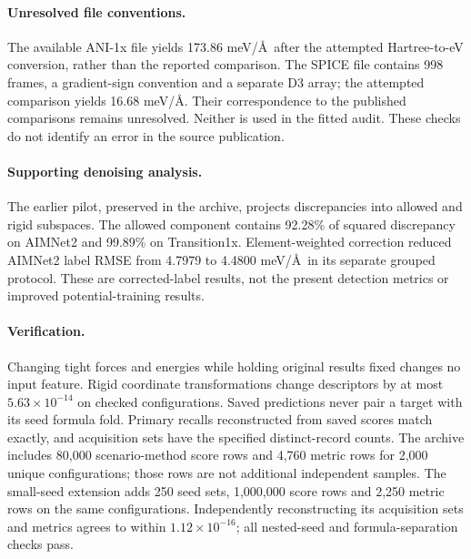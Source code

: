 \documentclass[11pt]{article}
\begin{document}
\paragraph{Unresolved file conventions.}
The available ANI-1x file yields 173.86 meV/\AA\ after the attempted Hartree-to-eV
conversion, rather than the reported comparison. The SPICE file contains 998
frames, a gradient-sign convention and a separate D3 array; the attempted
comparison yields 16.68 meV/\AA. Their correspondence to the published comparisons
remains unresolved. Neither is used in the fitted audit. These checks do not
identify an error in the source publication.

\paragraph{Supporting denoising analysis.}
The earlier pilot, preserved in the archive, projects discrepancies into allowed
and rigid subspaces. The allowed component contains 92.28\% of squared discrepancy
on AIMNet2 and 99.89\% on Transition1x. Element-weighted correction reduced AIMNet2
label RMSE from 4.7979 to 4.4800 meV/\AA\ in its separate grouped protocol. These
are corrected-label results, not the present detection metrics or improved
potential-training results.

\paragraph{Verification.}
Changing tight forces and energies while holding original results fixed changes
no input feature. Rigid coordinate transformations change descriptors by at most
$5.63\times10^{-14}$ on checked configurations. Saved predictions never pair a
target with its seed formula fold. Primary recalls reconstructed from saved scores
match exactly, and acquisition sets have the specified distinct-record counts.
The archive includes 80,000 scenario-method score rows and 4,760 metric rows for
2,000 unique configurations; those rows are not additional independent samples. The small-seed extension
adds 250 seed sets, 1,000,000 score rows and 2,250 metric rows on the same
configurations. Independently reconstructing its acquisition sets and metrics
agrees to within $1.12\times10^{-16}$; all nested-seed and formula-separation
checks pass.

\clearpage


\end{document}
